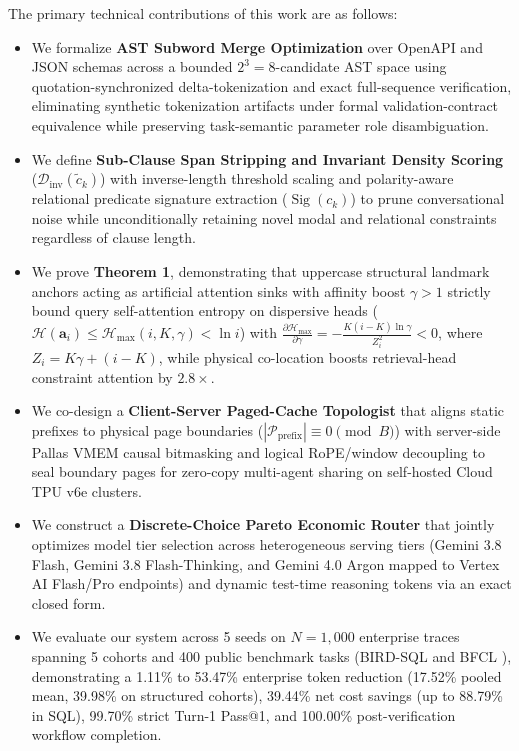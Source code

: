 \documentclass[conference,10pt]{IEEEtran}
\begin{document}
The primary technical contributions of this work are as follows:
\begin{itemize}
    \item We formalize \textbf{AST Subword Merge Optimization} over OpenAPI and JSON schemas \cite{bray2017rfc8259} across a bounded $2^3=8$-candidate AST space using quotation-synchronized delta-tokenization and exact full-sequence verification, eliminating synthetic tokenization artifacts under formal validation-contract equivalence while preserving task-semantic parameter role disambiguation.
    \item We define \textbf{Sub-Clause Span Stripping and Invariant Density Scoring} ($\mathcal{D}_{\text{inv}}(\tilde{c}_k)$) with inverse-length threshold scaling and polarity-aware relational predicate signature extraction ($\operatorname{Sig}(c_k)$) to prune conversational noise while unconditionally retaining novel modal and relational constraints regardless of clause length.
    \item We prove \textbf{Theorem 1}, demonstrating that uppercase structural landmark anchors acting as artificial attention sinks with affinity boost $\gamma > 1$ strictly bound query self-attention entropy on dispersive heads ($\mathcal{H}(\mathbf{a}_i) \le \mathcal{H}_{\max}(i, K, \gamma) < \ln i$) with $\frac{\partial\mathcal{H}_{\max}}{\partial\gamma} = -\frac{K(i-K)\ln\gamma}{Z_i^2} < 0$, where $Z_i = K\gamma + (i - K)$, while physical co-location boosts retrieval-head constraint attention by $2.8\times$.
    \item We co-design a \textbf{Client-Server Paged-Cache Topologist} that aligns static prefixes to physical page boundaries ($|\mathcal{P}_{\text{prefix}}| \equiv 0 \pmod B$) with server-side Pallas VMEM causal bitmasking and logical RoPE/window decoupling to seal boundary pages for zero-copy multi-agent sharing on self-hosted Cloud TPU v6e clusters.
    \item We construct a \textbf{Discrete-Choice Pareto Economic Router} that jointly optimizes model tier selection across heterogeneous serving tiers (Gemini 3.8 Flash, Gemini 3.8 Flash-Thinking, and Gemini 4.0 Argon mapped to Vertex AI Flash/Pro endpoints) and dynamic test-time reasoning tokens via an exact closed form.
    \item We evaluate our system across 5 seeds on $N = 1{,}000$ enterprise traces spanning 5 cohorts and 400 public benchmark tasks (BIRD-SQL \cite{bird2023} and BFCL \cite{patil2024gorilla}), demonstrating a 1.11\% to 53.47\% enterprise token reduction (17.52\% pooled mean, 39.98\% on structured cohorts), 39.44\% net cost savings (up to 88.79\% in SQL), 99.70\% strict Turn-1 Pass@1, and 100.00\% post-verification workflow completion.
\end{itemize}
\end{document}
